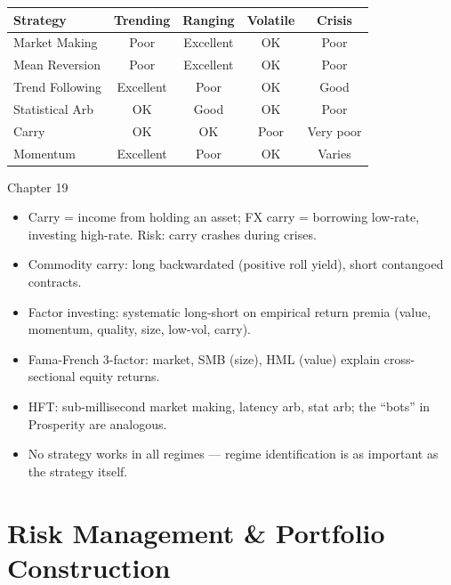 \documentclass[12pt,a4paper,openany]{report}
\theoremstyle{definition}
\begin{document}
\begin{center}
\begin{tabular}{lcccc}
\toprule
\textbf{Strategy} & \textbf{Trending} & \textbf{Ranging} & \textbf{Volatile} & \textbf{Crisis} \\
\midrule
Market Making      & Poor      & Excellent & OK         & Poor \\
Mean Reversion     & Poor      & Excellent & OK         & Poor \\
Trend Following    & Excellent & Poor      & OK         & Good \\
Statistical Arb    & OK        & Good      & OK         & Poor \\
Carry              & OK        & OK        & Poor       & Very poor \\
Momentum           & Excellent & Poor      & OK         & Varies \\
\bottomrule
\end{tabular}
\end{center}

\begin{takeawaybox}{Chapter 19}
\begin{itemize}
  \item Carry = income from holding an asset; FX carry = borrowing low-rate, investing high-rate. Risk: carry crashes during crises.
  \item Commodity carry: long backwardated (positive roll yield), short contangoed contracts.
  \item Factor investing: systematic long-short on empirical return premia (value, momentum, quality, size, low-vol, carry).
  \item Fama-French 3-factor: market, SMB (size), HML (value) explain cross-sectional equity returns.
  \item HFT: sub-millisecond market making, latency arb, stat arb; the ``bots'' in Prosperity are analogous.
  \item No strategy works in all regimes — regime identification is as important as the strategy itself.
\end{itemize}
\end{takeawaybox}


%
%
\part{Risk Management \& Portfolio Construction}
\end{document}

